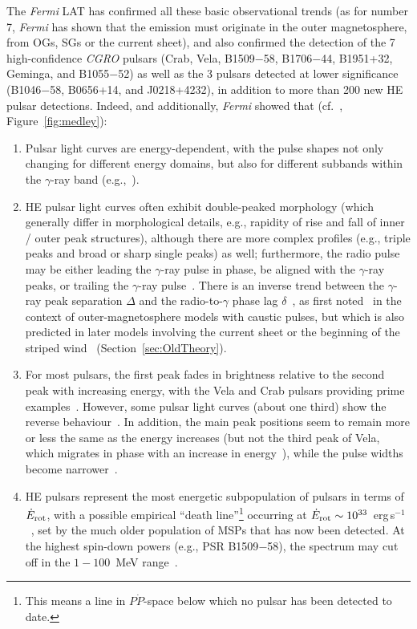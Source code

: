 \documentclass{PoS}
\begin{document}
The \textit{Fermi} LAT has confirmed all these basic observational trends (as for number 7, \textit{Fermi} has shown that the emission must originate in the outer magnetosphere, from OGs, SGs or the current sheet), and also confirmed the detection of the 7 high-confidence \textit{CGRO} pulsars (Crab, Vela, B1509$-$58, B1706$-$44, B1951+32, Geminga, and B1055$-$52) as well as the 3 pulsars detected at lower significance (B1046$-$58, B0656+14, and J0218+4232), in addition to more than 200 new HE pulsar detections. Indeed, and additionally, \textit{Fermi} showed that (cf.~\cite{2PC}, Figure~\ref{fig:medley}):
\begin{enumerate}
  \item Pulsar light curves are energy-dependent, with the pulse shapes not only changing for different energy domains, but also for different subbands within the $\gamma$-ray band  (e.g.,~\cite{Vela2}).
  \item HE pulsar light curves often exhibit double-peaked morphology (which generally differ in morphological details, e.g., rapidity of rise and fall of inner / outer peak structures), although there are more complex profiles (e.g., triple peaks and broad or sharp single peaks) as well; furthermore, the radio pulse may be either leading the $\gamma$-ray pulse in phase, be aligned with the $\gamma$-ray peaks, or trailing the $\gamma$-ray pulse~\cite{Johnson14}. There is an inverse trend between the $\gamma$-ray peak separation $\Delta$ and the radio-to-$\gamma$ phase lag $\delta$~\cite{2PC}, as first noted~\cite{RY95} in the context of outer-magnetosphere models with caustic pulses, but which is also predicted in later models involving the current sheet or the beginning of the striped wind~\cite{Kalapotharakos14,Petri11} (Section~\ref{sec:OldTheory}).
  \item For most pulsars, the first peak fades in brightness relative to the second peak with increasing energy, with the Vela and Crab pulsars providing prime examples~\cite{Vela2,MAGIC_Crab12}. However, some pulsar light curves (about one third) show the reverse behaviour~\cite{Brambilla15,Renault15}. In addition, the main peak positions seem to remain more or less the same as the energy increases (but not the third peak of Vela, which migrates in phase with an increase in energy~\cite{Vela2}), while the pulse widths become narrower~\cite{MAGIC_Crab12,DeNaurois15}.
  \item HE pulsars represent the most energetic subpopulation of pulsars in terms of $\dot{E}_{\rm rot}$, with a possible empirical ``death line''\footnote{This means a line in $P\dot{P}$-space below which no pulsar has been detected to date.} occurring at $\dot{E}_{\rm rot}\sim10^{33}$~erg\,s$^{-1}$~\cite{Guillemot16}, set by the much older population of MSPs that has now been detected. At the highest spin-down powers (e.g., PSR B1509$-$58), the spectrum may cut off in the $1-100$~MeV range~\cite{Kuiper15}.

\end{enumerate}
\end{document}
